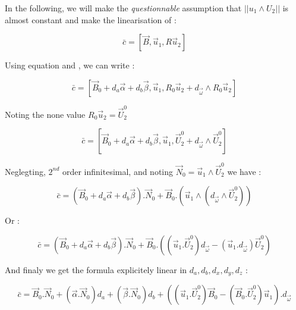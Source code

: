 In the following, we will make the \emph{questionnable} assumption that $||u_1 \wedge U_2||$ is almost
constant and make the linearisation of :

\begin{equation}
	\bar c = [\vec B,\vec u_1, R \vec u_2]
\end{equation}

Using equation \label{Eq:BundSimp:LinB} and \label{Eq:BundSimp:LinR}, we can write :


\begin{equation}
    \bar c =  [\vec B_0 + d_a \vec \alpha + d_b \vec \beta,\vec u_1, R_0 \vec u_2 + d_{\vec \omega }  \wedge   R_0 \vec u_2]
\end{equation}

Noting the none value $ R_0 \vec u_2= \vec U^0_2$

\begin{equation}
    \bar c =  [\vec B_0 + d_a \vec \alpha + d_b \vec \beta,\vec u_1, \vec U^0_2  + d_{\vec \omega }  \wedge   \vec U^0_2]
\end{equation}

Neglegting, $2^{nd}$ order infinitesimal,  and noting $\vec N_0= \vec u_1 \wedge \vec U^0_2 $ we have :

\begin{equation}
    \bar c =  (\vec B_0 + d_a \vec \alpha + d_b \vec \beta) . \vec N_0
       + \vec B_0 . (\vec u_1  \wedge  ( d_{\vec \omega }  \wedge   \vec U^0_2))
\end{equation}

Or :

\begin{equation}
    \bar c =  (\vec B_0 + d_a \vec \alpha + d_b \vec \beta) . \vec N_0
        + \vec B_0 . ( (\vec u_1 . \vec U^0_2)  d_{\vec \omega } -  (\vec u_1 . d_{\vec \omega }) \vec U^0_2)
\end{equation}

And finaly we get the formula explicitely linear in $d_a,d_b,d_x,d_y,d_z$ :


\begin{equation}
    \bar c =  \vec B_0 . \vec N_0 +  (\vec \alpha . \vec N_0) d_a  +  (\vec \beta . \vec N_0) d_b
        +  ( (\vec u_1 . \vec U^0_2) \vec B_0  -  (\vec B_0 .\vec U^0_2) \vec u_1 ) . d_{\vec \omega } 
\end{equation}


